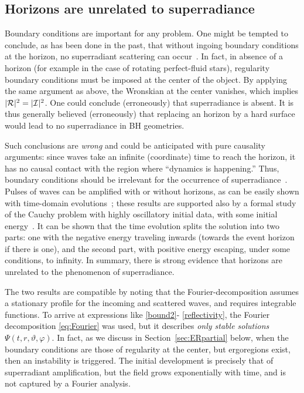 \documentclass[11pt]{article}
\numberwithin{equation}{section} %
\begin{document}
\subsection{Horizons are unrelated to superradiance}\label{sec:nohorSR}
Boundary conditions are important for any problem. One might be tempted to conclude, as has been done in the past, that 
without ingoing boundary conditions at the horizon, no superradiant scattering can 
occur~\cite{zeldovich1,zeldovich2,Bekenstein:1973mi,Richartz:2009mi,Cardoso:2012zn}. In fact, in absence of a horizon 
(for example in the case of rotating perfect-fluid stars), regularity boundary conditions must be imposed at the center 
of the object. By applying the same argument as above, the Wronskian at the center vanishes, which implies $|{\cal 
R}|^2=|{\cal I}|^2$. One could conclude (erroneously) that superradiance is absent.  It is thus generally believed 
(erroneously) that replacing an horizon by a hard surface would lead to no superradiance in BH geometries.


 Such conclusions are {\it wrong} and could be anticipated with pure causality arguments: since waves  take  an
infinite  (coordinate) time to reach the horizon, it has no causal contact with the region where ``dynamics  is  
happening.'' Thus, boundary conditions should  be  irrelevant for the occurrence of 
superradiance~\cite{Vicente:2018mxl}. Pulses of waves can be amplified with or without horizons, as can be easily shown 
with time-domain evolutions~\cite{Vicente:2018mxl}; these results are supported also by a formal study of the Cauchy problem with highly oscillatory initial data, with some initial energy~\cite{Eskin:2015ssa}. It can be shown that the time evolution splits the solution into two parts: one with the negative energy traveling inwards (towards the event horizon if there is one), and the second part, with positive energy escaping, under some conditions, to infinity. In summary, there is strong evidence that horizons are unrelated to the phenomenon of superradiance.


The two results are compatible by noting that the Fourier-decomposition assumes a stationary profile for the incoming and scattered waves, and requires integrable functions. To arrive at expressions like \eqref{bound2}-
\eqref{reflectivity}, the Fourier decomposition \eqref{eq:Fourier} was used, but it describes {\it only stable 
solutions} $\Psi(t,r,\vartheta,\varphi)$. In fact, as we discuss in Section~\ref{sec:ERpartial} below, when 
the boundary conditions are those of regularity at the center, but ergoregions exist, then an instability is triggered. 
The initial development is precisely that of superradiant amplification, but the  field grows exponentially with time, 
and is not captured by a Fourier analysis. 
\end{document}
